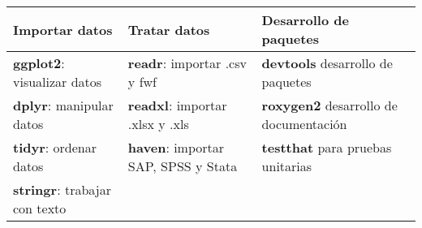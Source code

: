 \documentclass[]{book}
\begin{document}
\begin{longtable}[]{@{}lll@{}}
\toprule
\begin{minipage}[b]{0.30\columnwidth}\raggedright
Importar datos\strut
\end{minipage} & \begin{minipage}[b]{0.30\columnwidth}\raggedright
Tratar datos\strut
\end{minipage} & \begin{minipage}[b]{0.30\columnwidth}\raggedright
Desarrollo de paquetes\strut
\end{minipage}\tabularnewline
\midrule
\endhead
\begin{minipage}[t]{0.30\columnwidth}\raggedright
\textbf{ggplot2}: visualizar datos\strut
\end{minipage} & \begin{minipage}[t]{0.30\columnwidth}\raggedright
\textbf{readr}: importar .csv y fwf\strut
\end{minipage} & \begin{minipage}[t]{0.30\columnwidth}\raggedright
\textbf{devtools} desarrollo de paquetes\strut
\end{minipage}\tabularnewline
\begin{minipage}[t]{0.30\columnwidth}\raggedright
\textbf{dplyr}: manipular datos\strut
\end{minipage} & \begin{minipage}[t]{0.30\columnwidth}\raggedright
\textbf{readxl}: importar .xlsx y .xls\strut
\end{minipage} & \begin{minipage}[t]{0.30\columnwidth}\raggedright
\textbf{roxygen2} desarrollo de documentación\strut
\end{minipage}\tabularnewline
\begin{minipage}[t]{0.30\columnwidth}\raggedright
\textbf{tidyr}: ordenar datos\strut
\end{minipage} & \begin{minipage}[t]{0.30\columnwidth}\raggedright
\textbf{haven}: importar SAP, SPSS y Stata\strut
\end{minipage} & \begin{minipage}[t]{0.30\columnwidth}\raggedright
\textbf{testthat} para pruebas unitarias\strut
\end{minipage}\tabularnewline
\begin{minipage}[t]{0.30\columnwidth}\raggedright
\textbf{stringr}: trabajar con texto\strut
\end{minipage} & \begin{minipage}[t]{0.30\columnwidth}\raggedright

\end{minipage}
\end{longtable}
\end{document}

